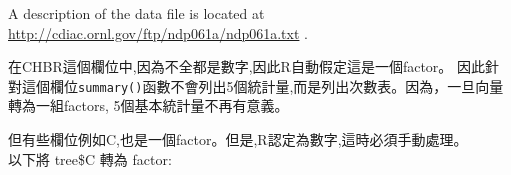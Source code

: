 \documentclass[]{book}
\newenvironment{Shaded}{\begin{snugshade}}{\end{snugshade}}
\newcommand{\KeywordTok}[1]{\textcolor[rgb]{0.13,0.29,0.53}{\textbf{#1}}}
\newcommand{\StringTok}[1]{\textcolor[rgb]{0.31,0.60,0.02}{#1}}
\newcommand{\OperatorTok}[1]{\textcolor[rgb]{0.81,0.36,0.00}{\textbf{#1}}}
\newcommand{\NormalTok}[1]{#1}
\theoremstyle{definition}
\theoremstyle{definition}
\theoremstyle{definition}
\theoremstyle{remark}
\begin{document}
A description of the data file is located at
\url{http://cdiac.ornl.gov/ftp/ndp061a/ndp061a.txt} .

\begin{Shaded}
\end{Shaded}

在CHBR這個欄位中,因為不全都是數字,因此R自動假定這是一個factor。
因此針對這個欄位\texttt{summary()}函數不會列出5個統計量,而是列出次數表。因為，一旦向量轉為一組factors,
5個基本統計量不再有意義。

但有些欄位例如C,也是一個factor。但是,R認定為數字,這時必須手動處理。\\
以下將 tree\$C 轉為 factor:

\begin{Shaded}
\end{Shaded}

\begin{Shaded}
\end{Shaded}

\begin{Shaded}
\end{Shaded}

\begin{Shaded}
\end{Shaded}

\begin{Shaded}
\end{Shaded}
\end{document}
